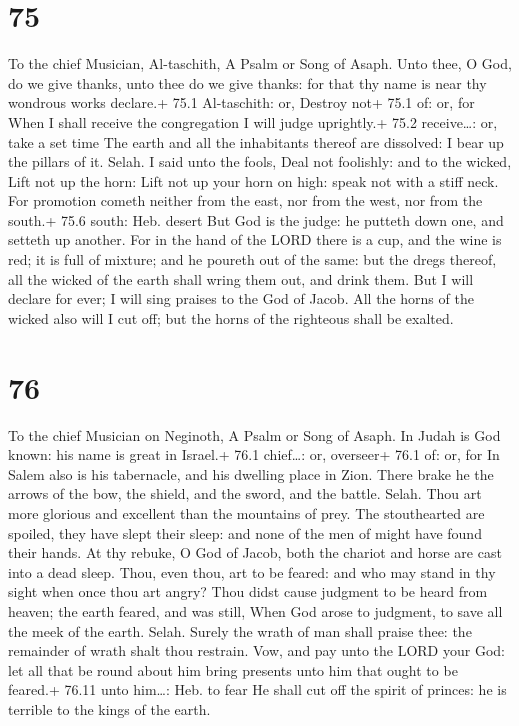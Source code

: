 \hypertarget{section-74}{%
\section{75}\label{section-74}}

To the chief Musician, Al-taschith, A Psalm or Song of Asaph.
 Unto thee, O God, do we give thanks, unto thee do we give
thanks: for that thy name is near thy wondrous works declare.+ 75.1
Al-taschith: or, Destroy not+ 75.1 of: or, for  When I shall
receive the congregation I will judge uprightly.+ 75.2 receive\ldots:
or, take a set time  The earth and all the inhabitants
thereof are dissolved: I bear up the pillars of it. Selah. 
I said unto the fools, Deal not foolishly: and to the wicked, Lift not
up the horn:  Lift not up your horn on high: speak not with
a stiff neck.  For promotion cometh neither from the east,
nor from the west, nor from the south.+ 75.6 south: Heb. desert
 But God is the judge: he putteth down one, and setteth up
another.  For in the hand of the LORD there is a cup, and
the wine is red; it is full of mixture; and he poureth out of the same:
but the dregs thereof, all the wicked of the earth shall wring them out,
and drink them.  But I will declare for ever; I will sing
praises to the God of Jacob.  All the horns of the wicked
also will I cut off; but the horns of the righteous shall be exalted.

\hypertarget{section-75}{%
\section{76}\label{section-75}}

To the chief Musician on Neginoth, A Psalm or Song of Asaph.
 In Judah is God known: his name is great in Israel.+ 76.1
chief\ldots: or, overseer+ 76.1 of: or, for  In Salem also
is his tabernacle, and his dwelling place in Zion.  There
brake he the arrows of the bow, the shield, and the sword, and the
battle. Selah.  Thou art more glorious and excellent than
the mountains of prey.  The stouthearted are spoiled, they
have slept their sleep: and none of the men of might have found their
hands.  At thy rebuke, O God of Jacob, both the chariot and
horse are cast into a dead sleep.  Thou, even thou, art to
be feared: and who may stand in thy sight when once thou art angry?
 Thou didst cause judgment to be heard from heaven; the
earth feared, and was still,  When God arose to judgment, to
save all the meek of the earth. Selah.  Surely the wrath of
man shall praise thee: the remainder of wrath shalt thou restrain.
 Vow, and pay unto the LORD your God: let all that be round
about him bring presents unto him that ought to be feared.+ 76.11 unto
him\ldots: Heb. to fear  He shall cut off the spirit of
princes: he is terrible to the kings of the earth.

